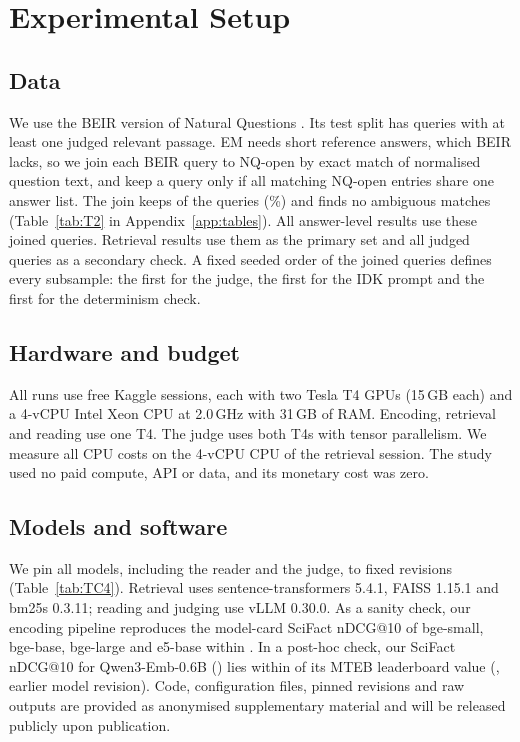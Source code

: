 \section{Experimental Setup}
\label{sec:setup}

\subsection{Data}
\label{sec:data}
We use the BEIR version \citep{thakur2021beir} of Natural Questions \citep{kwiatkowski2019nq}.
Its test split has  queries with at least one judged relevant passage.
EM needs short reference answers, which BEIR lacks, so we join each BEIR query to NQ-open \citep{lee2019latent} by exact match of normalised question text, and keep a query only if all matching NQ-open entries share one answer list.
The join keeps  of the  queries (\%) and finds no ambiguous matches (Table~\ref{tab:T2} in Appendix~\ref{app:tables}).
All answer-level results use these  joined queries.
Retrieval results use them as the primary set and all  judged queries as a secondary check.
A fixed seeded order of the joined queries defines every subsample: the first  for the judge, the first  for the IDK prompt and the first  for the determinism check.

\subsection{Hardware and budget}
\label{sec:hardware}
All runs use free Kaggle sessions, each with two Tesla T4 GPUs (15\,GB each) and a 4-vCPU Intel Xeon CPU at 2.0\,GHz with 31\,GB of RAM.
Encoding, retrieval and reading use one T4.
The judge uses both T4s with tensor parallelism.
We measure all CPU costs on the 4-vCPU CPU of the retrieval session.
The study used no paid compute, API or data, and its monetary cost was zero.

\subsection{Models and software}
\label{sec:models}
We pin all models, including the reader and the judge, to fixed revisions (Table~\ref{tab:TC4}).
Retrieval uses sentence-transformers 5.4.1, FAISS 1.15.1 and bm25s 0.3.11; reading and judging use vLLM 0.30.0.
As a sanity check, our encoding pipeline reproduces the model-card SciFact nDCG@10 of bge-small, bge-base, bge-large and e5-base within . In a post-hoc check, our SciFact nDCG@10 for Qwen3-Emb-0.6B () lies within  of its MTEB leaderboard value (, earlier model revision).
Code, configuration files, pinned revisions and raw outputs are provided as anonymised supplementary material and will be released publicly upon publication.

